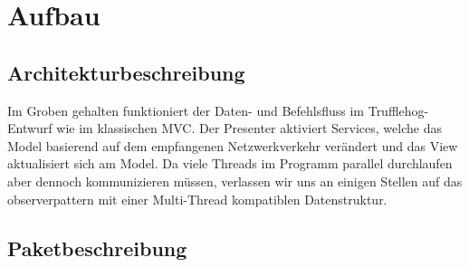 \chapter{Aufbau \programname}

\section{Architekturbeschreibung}
Im Groben gehalten funktioniert der Daten- und Befehlsfluss im Trufflehog-Entwurf
wie im klassischen MVC. Der Presenter aktiviert Services, welche das Model basierend
auf dem empfangenen Netzwerkverkehr verändert und das View aktualisiert sich am Model.
Da viele Threads im Programm parallel durchlaufen aber dennoch kommunizieren müssen,
verlassen wir uns an einigen Stellen auf das \gls{observerpattern} mit einer
Multi-Thread kompatiblen Datenstruktur.\newline
\newline

\section{Paketbeschreibung}

